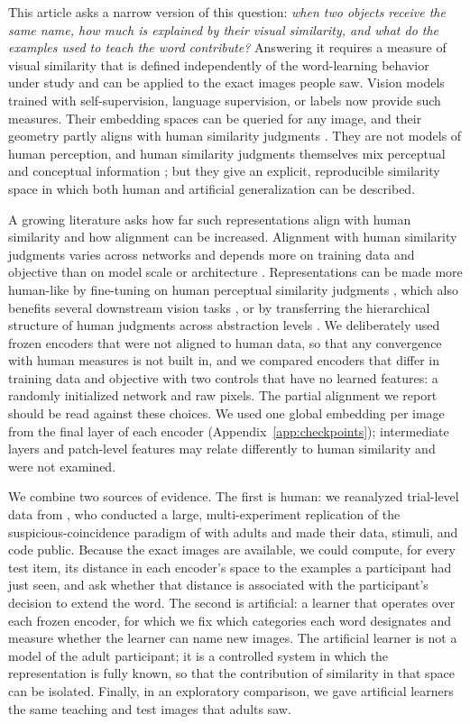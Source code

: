 \documentclass[11pt]{article}
\begin{document}
This article asks a narrow version of this question: \emph{when two objects receive the same name, how much is explained by their visual similarity, and what do the examples used to teach the word contribute?} Answering it requires a measure of visual similarity that is defined independently of the word-learning behavior under study and can be applied to the exact images people saw. Vision models trained with self-supervision, language supervision, or labels now provide such measures. Their embedding spaces can be queried for any image, and their geometry partly aligns with human similarity judgments \parencite{hebart2020,roads2021}. They are not models of human perception, and human similarity judgments themselves mix perceptual and conceptual information \parencite{hebart2020,hebart2023}; but they give an explicit, reproducible similarity space in which both human and artificial generalization can be described.

A growing literature asks how far such representations align with human similarity and how alignment can be increased. Alignment with human similarity judgments varies across networks and depends more on training data and objective than on model scale or architecture \parencite{muttenthaler2023}. Representations can be made more human-like by fine-tuning on human perceptual similarity judgments \parencite{fu2023}, which also benefits several downstream vision tasks \parencite{sundaram2024}, or by transferring the hierarchical structure of human judgments across abstraction levels \parencite{muttenthaler2025}. We deliberately used frozen encoders that were not aligned to human data, so that any convergence with human measures is not built in, and we compared encoders that differ in training data and objective with two controls that have no learned features: a randomly initialized network and raw pixels. The partial alignment we report should be read against these choices. We used one global embedding per image from the final layer of each encoder (Appendix~\ref{app:checkpoints}); intermediate layers and patch-level features may relate differently to human similarity and were not examined.

We combine two sources of evidence. The first is human: we reanalyzed trial-level data from \textcite{lewis2018}, who conducted a large, multi-experiment replication of the suspicious-coincidence paradigm of \textcite{xu2007} with adults and made their data, stimuli, and code public. Because the exact images are available, we could compute, for every test item, its distance in each encoder's space to the examples a participant had just seen, and ask whether that distance is associated with the participant's decision to extend the word. The second is artificial: a learner that operates over each frozen encoder, for which we fix which categories each word designates and measure whether the learner can name new images. The artificial learner is not a model of the adult participant; it is a controlled system in which the representation is fully known, so that the contribution of similarity in that space can be isolated. Finally, in an exploratory comparison, we gave artificial learners the same teaching and test images that adults saw.
\end{document}

